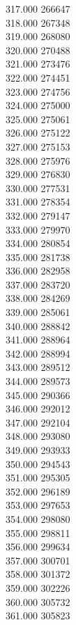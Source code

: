 { 317.000	266647 \\
 318.000	267348 \\
 319.000	268080 \\
 320.000	270488 \\
 321.000	273476 \\
 322.000	274451 \\
 323.000	274756 \\
 324.000	275000 \\
 325.000	275061 \\
 326.000	275122 \\
 327.000	275153 \\
 328.000	275976 \\
 329.000	276830 \\
 330.000	277531 \\
 331.000	278354 \\
 332.000	279147 \\
 333.000	279970 \\
 334.000	280854 \\
 335.000	281738 \\
 336.000	282958 \\
 337.000	283720 \\
 338.000	284269 \\
 339.000	285061 \\
 340.000	288842 \\
 341.000	288964 \\
 342.000	288994 \\
 343.000	289512 \\
 344.000	289573 \\
 345.000	290366 \\
 346.000	292012 \\
 347.000	292104 \\
 348.000	293080 \\
 349.000	293933 \\
 350.000	294543 \\
 351.000	295305 \\
 352.000	296189 \\
 353.000	297653 \\
 354.000	298080 \\
 355.000	298811 \\
 356.000	299634 \\
 357.000	300701 \\
 358.000	301372 \\
 359.000	302226 \\
 360.000	305732 \\
 361.000	305823 \\
}
